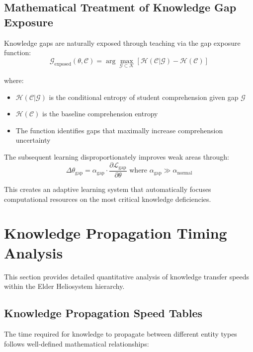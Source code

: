 \subsection{Mathematical Treatment of Knowledge Gap Exposure}

Knowledge gaps are naturally exposed through teaching via the gap exposure function:
\begin{equation}
\mathcal{G}_{\text{exposed}}(\theta, \mathcal{C}) = \arg\max_{\mathcal{G} \subset \mathcal{K}} \left[ \mathcal{H}(\mathcal{C}|\mathcal{G}) - \mathcal{H}(\mathcal{C}) \right]
\end{equation}

where:
\begin{itemize}
    \item $\mathcal{H}(\mathcal{C}|\mathcal{G})$ is the conditional entropy of student comprehension given gap $\mathcal{G}$
    \item $\mathcal{H}(\mathcal{C})$ is the baseline comprehension entropy
    \item The function identifies gaps that maximally increase comprehension uncertainty
\end{itemize}

The subsequent learning disproportionately improves weak areas through:
\begin{equation}
\Delta\theta_{\text{gap}} = \alpha_{\text{gap}} \cdot \frac{\partial \mathcal{L}_{\text{gap}}}{\partial \theta} \text{ where } \alpha_{\text{gap}} \gg \alpha_{\text{normal}}
\end{equation}

This creates an adaptive learning system that automatically focuses computational resources on the most critical knowledge deficiencies.

\section{Knowledge Propagation Timing Analysis}

This section provides detailed quantitative analysis of knowledge transfer speeds within the Elder Heliosystem hierarchy.

\subsection{Knowledge Propagation Speed Tables}

The time required for knowledge to propagate between different entity types follows well-defined mathematical relationships:


